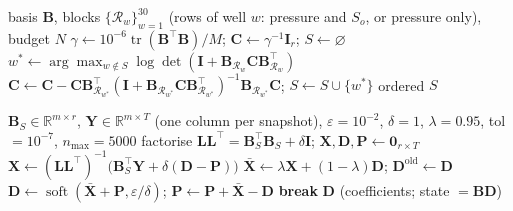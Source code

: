 \begin{algorithm}[htbp]
\caption{Block determinant-greedy selection of existing wells (\texttt{block\_dg})}
\label{alg:S_blockdg}
\small
\begin{algorithmic}[1]
\Require basis $\mathbf{B}$, blocks $\{\mathcal{R}_w\}_{w=1}^{30}$ (rows of well $w$: pressure and $S_o$, or pressure only), budget $N$
\State $\gamma\gets10^{-6}\operatorname{tr}(\mathbf{B}^\top\mathbf{B})/M$; \quad $\mathbf{C}\gets\gamma^{-1}\mathbf{I}_r$; \quad $S\gets\varnothing$
  \State $w^\ast\gets\arg\max_{w\notin S}\log\det(\mathbf{I}+\mathbf{B}_{\mathcal{R}_w}\mathbf{C}\mathbf{B}_{\mathcal{R}_w}^\top)$
  \State $\mathbf{C}\gets\mathbf{C}-\mathbf{C}\mathbf{B}_{\mathcal{R}_{w^\ast}}^\top(\mathbf{I}+\mathbf{B}_{\mathcal{R}_{w^\ast}}\mathbf{C}\mathbf{B}_{\mathcal{R}_{w^\ast}}^\top)^{-1}\mathbf{B}_{\mathcal{R}_{w^\ast}}\mathbf{C}$; \quad $S\gets S\cup\{w^\ast\}$
\EndFor
\State \Return ordered $S$
\end{algorithmic}
\end{algorithm}

\begin{algorithm}[htbp]
\caption{Vectorised relaxed ADMM for the $\ell_1$ estimator (\texttt{l1\_admm})}
\label{alg:S_admm}
\small
\begin{algorithmic}[1]
\Require $\mathbf{B}_S\in\mathbb{R}^{m\times r}$, $\mathbf{Y}\in\mathbb{R}^{m\times T}$ (one column per snapshot), $\varepsilon=10^{-2}$, $\delta=1$, $\lambda=0.95$, tol $=10^{-7}$, $n_{\max}=5000$
\State factorise $\mathbf{L}\mathbf{L}^\top=\mathbf{B}_S^\top\mathbf{B}_S+\delta\mathbf{I}$; \quad $\mathbf{X},\mathbf{D},\mathbf{P}\gets\mathbf{0}_{r\times T}$
  \State $\mathbf{X}\gets(\mathbf{L}\mathbf{L}^\top)^{-1}\bigl(\mathbf{B}_S^\top\mathbf{Y}+\delta(\mathbf{D}-\mathbf{P})\bigr)$
  \State $\bar{\mathbf{X}}\gets\lambda\mathbf{X}+(1-\lambda)\mathbf{D}$; \quad $\mathbf{D}^{\mathrm{old}}\gets\mathbf{D}$
  \State $\mathbf{D}\gets\operatorname{soft}(\bar{\mathbf{X}}+\mathbf{P},\varepsilon/\delta)$; \quad $\mathbf{P}\gets\mathbf{P}+\bar{\mathbf{X}}-\mathbf{D}$
   \State \textbf{break} \EndIf
\EndFor
\State \Return $\mathbf{D}$ (coefficients; state $=\mathbf{B}\mathbf{D}$)
\end{algorithmic}
\end{algorithm}

